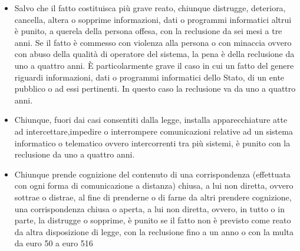 \begin{itemize}
    \item Salvo che il fatto costituisca più grave reato, chiunque distrugge, deteriora, cancella, altera o sopprime informazioni, dati o programmi informatici altrui è punito, a querela della persona offesa, con la reclusione da sei mesi a tre anni. Se il fatto è commesso con violenza alla persona o con minaccia ovvero con abuso della qualità di operatore del sistema, la pena è della reclusione da uno a quattro anni.
        \newline È particolarmente grave il caso in cui un fatto del genere riguardi informazioni, dati o programmi informatici dello Stato, di un ente pubblico o ad essi pertinenti. In questo caso la reclusione va da uno a quattro anni.
    \item Chiunque, fuori dai casi consentiti dalla legge, installa apparecchiature atte ad intercettare,impedire o interrompere comunicazioni relative ad un sistema informatico o telematico ovvero intercorrenti tra più sistemi, è punito con la reclusione da uno a quattro anni. 
    \item Chiunque prende cognizione del contenuto di una corrispondenza (effettuata con ogni forma di comunicazione a distanza) chiusa, a lui non diretta, ovvero sottrae o distrae, al fine di prenderne o di farne da altri prendere cognizione, una corrispondenza chiusa o aperta, a lui non diretta, ovvero, in tutto o in parte, la distrugge o sopprime, è punito se il fatto non è previsto come reato da altra disposizione di legge, con la reclusione fino a un anno o con la multa da euro 50 a euro 516
\end{itemize}
